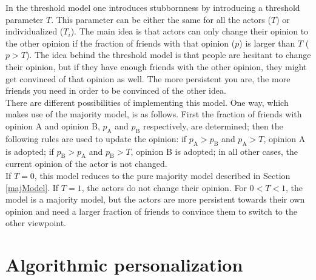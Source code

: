 \documentclass[11 pt , letterpaper , twoside , openright]{book}
\begin{document}
In the threshold model one introduces stubbornness by introducing a threshold parameter $T$. This parameter can be either the same for all the actors ($T$) or individualized ($T_i$). The main idea is that actors can only change their opinion to the other opinion if the fraction of friends with that opinion ($p$) is larger than $T$ ($p > T$). The idea behind the threshold model is that people are hesitant to change their opinion, but if they have enough friends with the other opinion, they might get convinced of that opinion as well. The more persistent you are, the more friends you need in order to be convinced of the other idea. \\
\newline
There are different possibilities of implementing this model. One way, which makes use of the majority model, is as follows. First the fraction of friends with opinion A and opinion B, $p_\text{A}$ and $p_\text{B}$ respectively, are determined; then the following rules are used to update the opinion: if $p_\text{A} > p_\text{B}$ and $p_\text{A} > T$, opinion A is adopted; if $p_\text{B} > p_\text{A}$ and $p_\text{B} > T$, opinion B is adopted; in all other cases, the current opinion of the actor is not changed.\\
\newline
If $T = 0$, this model reduces to the pure majority model described in Section \ref{majModel}. If $T = 1$, the actors do not change their opinion. For $0 < T < 1$, the model is a majority model, but the actors are more persistent towards their own opinion and need a larger fraction of friends to convince them to switch to the other viewpoint.

\section{Algorithmic personalization}\label{filter}
\end{document}
